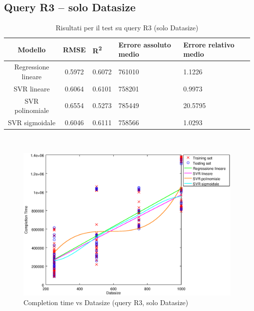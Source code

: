 \documentclass[a4paper,11pt]{article}
\begin{document}
\subsection{Query R3 -- solo Datasize}
\begin{table}[bhpt]
	\centering
	\begin{adjustbox}{center}
		\begin{tabular}{c | c M{1.2cm} M{2.5cm} M{2.5cm} M{1.8cm}}
			Modello & RMSE & R\textsuperscript{2} & Errore assoluto medio & Errore relativo medio \tabularnewline
			\hline
			Regressione lineare & 0.5972 & 0.6072 & 761010 & 1.1226 \\
			SVR lineare & 0.6064 & 0.6101 & 758201 & 0.9973 \\
			SVR polinomiale & 0.6554 & 0.5273 & 785449 & 20.5795 \\
			SVR sigmoidale & 0.6046 & 0.6111 & 758566 & 1.0293 \\
		\end{tabular}
	\end{adjustbox}
	\\
	\caption{Risultati per il test su query R3 (solo Datasize)}
	\label{table_R3_datasize}
\end{table}

\begin {figure}[hbtp]
\centering
\includegraphics[width=\textwidth]{output/R3_SOLO_DATASIZE/plot_R3.eps}
\caption {Completion time vs Datasize (query R3, solo Datasize)}
\end {figure}

\newpage
\end{document}
